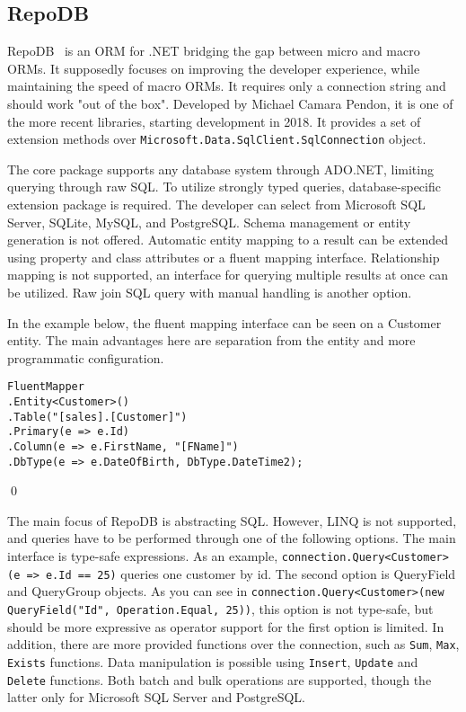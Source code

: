 \subsection{RepoDB}
RepoDB~\cite{RepoDB, RepoDBRepo} is an ORM for .NET bridging the gap between micro and macro ORMs. It supposedly focuses on improving the developer experience, while maintaining the speed of macro ORMs. It requires only a connection string and should work "out of the box". Developed by Michael Camara Pendon, it is one of the more recent libraries, starting development in 2018. It provides a set of extension methods over \texttt{Microsoft.Data.SqlClient.SqlConnection} object. 

The core package supports any database system through ADO.NET, limiting querying through raw SQL. To utilize strongly typed queries, database-specific extension package is required. The developer can select from Microsoft SQL Server, SQLite, MySQL, and PostgreSQL. Schema management or entity generation is not offered. Automatic entity mapping to a result can be extended using property and class attributes or a fluent mapping interface. Relationship mapping is not supported, an interface for querying multiple results at once can be utilized. Raw join SQL query with manual handling is another option.

\begin{example}
\small
In the example\cite{RepoDB} below, the fluent mapping interface can be seen on a Customer entity. The main advantages here are separation from the entity and more programmatic configuration.

\begin{lstlisting}[language=CSharp]
FluentMapper
.Entity<Customer>()
.Table("[sales].[Customer]")
.Primary(e => e.Id)
.Column(e => e.FirstName, "[FName]")
.DbType(e => e.DateOfBirth, DbType.DateTime2);
\end{lstlisting}
\qed
\end{example}

The main focus of RepoDB is abstracting SQL. However, LINQ is not supported, and queries have to be performed through one of the following options. The main interface is type-safe expressions. As an example, \lstinline{connection.Query<Customer>(e => e.Id == 25)} queries one customer by id. The second option is QueryField and QueryGroup objects. As you can see in \lstinline{connection.Query<Customer>(new QueryField("Id", Operation.Equal, 25))}, this option is not type-safe, but should be more expressive as operator support for the first option is limited. In addition, there are more provided functions over the connection, such as \texttt{Sum}, \texttt{Max}, \texttt{Exists} functions. Data manipulation is possible using \texttt{Insert}, \texttt{Update} and \texttt{Delete} functions. Both batch and bulk operations are supported, though the latter only for Microsoft SQL Server and PostgreSQL.

